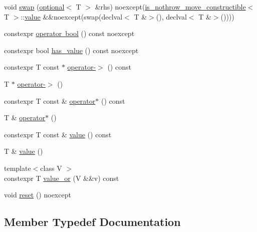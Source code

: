 \begin{DoxyCompactItemize}
\item 
void \mbox{\hyperlink{classstd_1_1experimental_1_1optional_ad1173a269b43cd9ed55930c3eed0a4dd}{swap}} (\mbox{\hyperlink{classstd_1_1experimental_1_1optional}{optional}}$<$ T $>$ \&rhs) noexcept(\mbox{\hyperlink{structstd_1_1experimental_1_1is__nothrow__move__constructible}{is\+\_\+nothrow\+\_\+move\+\_\+constructible}}$<$ T $>$\+::\mbox{\hyperlink{classstd_1_1experimental_1_1optional_ad1277f09c288255dfe102b72e7107be6}{value}} \&\&noexcept(swap(declval$<$ T \&$>$(), declval$<$ T \&$>$())))
\item 
constexpr \mbox{\hyperlink{classstd_1_1experimental_1_1optional_ac97eb00f6c8eb86920755ca75c31c24c}{operator bool}} () const noexcept
\item 
constexpr bool \mbox{\hyperlink{classstd_1_1experimental_1_1optional_a98002656a42c0339158cc0bce10c89a4}{has\+\_\+value}} () const noexcept
\item 
constexpr T const  $\ast$ \mbox{\hyperlink{classstd_1_1experimental_1_1optional_af0dc4f70b9e9948d7e3fc6f3d3cb93a4}{operator-\/$>$}} () const
\item 
T $\ast$ \mbox{\hyperlink{classstd_1_1experimental_1_1optional_ae600987ec09d6e04e894ddbe5f0a0b3f}{operator-\/$>$}} ()
\item 
constexpr T const  \& \mbox{\hyperlink{classstd_1_1experimental_1_1optional_a33265a6fff3cc57577805adc1fc433e5}{operator$\ast$}} () const
\item 
T \& \mbox{\hyperlink{classstd_1_1experimental_1_1optional_aba547a62e0c8e3cc7d3fcf152e31d56e}{operator$\ast$}} ()
\item 
constexpr T const  \& \mbox{\hyperlink{classstd_1_1experimental_1_1optional_ad1277f09c288255dfe102b72e7107be6}{value}} () const
\item 
T \& \mbox{\hyperlink{classstd_1_1experimental_1_1optional_a2278733d39a8c6b6c032f080b5ca0644}{value}} ()
\item 
{\footnotesize template$<$class V $>$ }\\constexpr T \mbox{\hyperlink{classstd_1_1experimental_1_1optional_a7556c77490cf4fc004291fc7c6696967}{value\+\_\+or}} (V \&\&v) const
\item 
void \mbox{\hyperlink{classstd_1_1experimental_1_1optional_a6ce77ba1776c86de36a5ae1d16dfd80f}{reset}} () noexcept
\end{DoxyCompactItemize}


\subsection{Member Typedef Documentation}
\mbox{\label{classstd_1_1experimental_1_1optional_a3b480b4a74492ffdbcc9d8529ed512fc}} 
